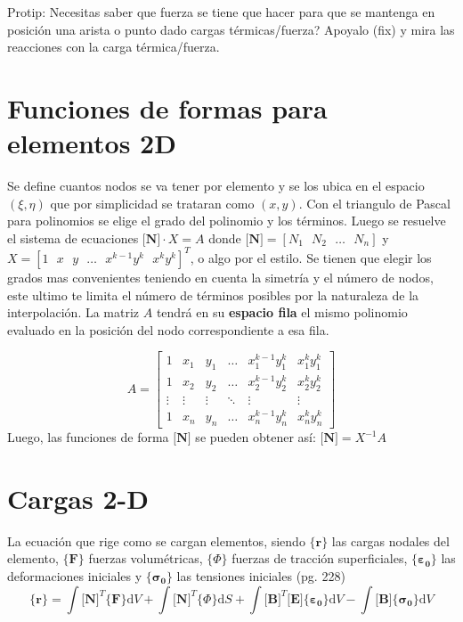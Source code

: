 \documentclass[11pt, a4paper,titlepage]{article}
\newcommand{\ms}{\ \ \ } %
\newcommand{\di}{\textrm{d}}
\newcommand{\sigmab}{\boldsymbol{\sigma}}
\newcommand{\varepsilonb}{\boldsymbol{\varepsilon}}
\newcommand{\CPhi}{\boldsymbol{\{ } \Phi \boldsymbol{\} }}
\newcommand{\Mme}[1]{\boldsymbol{[}\mathbf{#1} \boldsymbol{]}}
\newcommand{\Cme}[1]{\boldsymbol{\{ }\mathbf{#1} \boldsymbol{\}} }
\newcommand{\MB}{\Mme{B}}
\newcommand{\MN}{\Mme{N}}
\newcommand{\ME}{\Mme{E}}
\begin{document}
\clearpage
Protip: Necesitas saber que fuerza se tiene que hacer para que se mantenga en posición una arista o punto dado cargas térmicas/fuerza? Apoyalo (fix) y mira las reacciones con la carga térmica/fuerza.






\section{Funciones de formas para elementos 2D}
Se define cuantos nodos se va tener por elemento y se los ubica en el espacio $(\xi,\eta)$ que por simplicidad se trataran como $(x,y)$. Con el triangulo de Pascal para polinomios se elige el grado del polinomio y los términos. Luego se resuelve el sistema de ecuaciones $\MN\cdot X= A$ donde $\MN=[N_1\ms N_2 \ms \ldots\ms N_n]$ y $X=[1\ms x\ms y \ms\ldots\ms x^{k-1}y^{k} \ms x^{k}y^{k}]^T$, o algo por el estilo. Se tienen que elegir los grados mas convenientes teniendo en cuenta la simetría y el número de nodos, este ultimo te limita el número de términos posibles por la naturaleza de la interpolación. La matriz $A$ tendrá en su \textbf{espacio fila} el mismo polinomio evaluado en la posición del nodo correspondiente a esa fila.

\[
A=
\begin{bmatrix}
    1 & x_1 & y_1 & \dots  & x_{1}^{k-1}y_1^{k} & x_{1}^{k}y_1^{k} \\
    1 & x_2 & y_2 & \dots  & x_{2}^{k-1}y_2^{k} & x_{2}^{k}y_2^{k} \\
    \vdots & \vdots & \vdots & \ddots & \vdots& \vdots \\
    1 & x_n & y_n & \dots  & x_{n}^{k-1}y_n^{k} & x_{n}^{k}y_n^{k}
\end{bmatrix}
\]
Luego, las funciones de forma $\MN$ se pueden obtener así: $\MN=X^{-1} A$

\section*{Cargas 2-D}
La ecuación que rige como se cargan elementos, siendo $\Cme{r}$ las cargas nodales del elemento, $\Cme{F}$ fuerzas volumétricas, $\CPhi$ fuerzas de tracción superficiales, $\Cme{\varepsilonb_0}$ las deformaciones iniciales y $\Cme{\sigmab_0}$ las tensiones iniciales (pg. 228)
\begin{equation} \label{eq:CargasGenerales}
\Cme{r}=\int \MN^T \Cme{F} \di V +\int \MN^T \CPhi \di S+\int \MB^T \ME \Cme{\varepsilonb_0} \di V- \int \MB \Cme{\sigmab_0} \di V
\end{equation}
\end{document}
